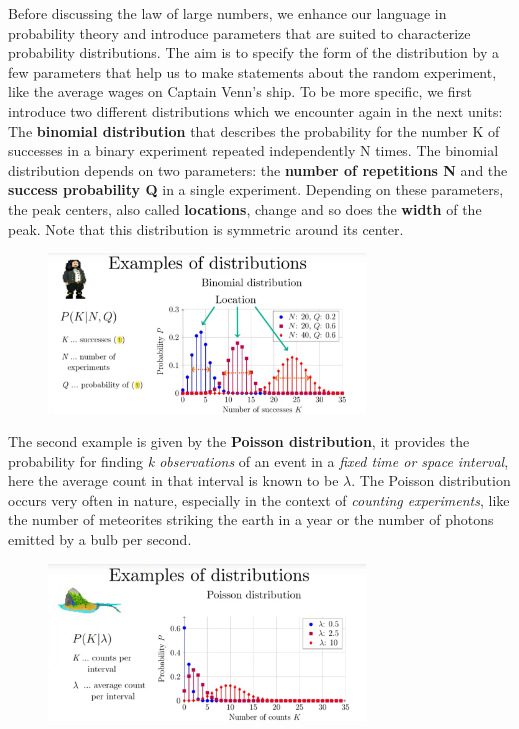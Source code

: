 \documentclass[12pt, a4paper]{scrartcl}
\begin{document}
Before discussing the law of large numbers, we enhance our language in probability theory and introduce parameters that are suited to characterize probability distributions.
The aim is to specify the form of the distribution by a few parameters that help us to make statements about the random experiment, like the average wages on Captain Venn's ship.
To be more specific, we first introduce two different distributions which we encounter again in the next units:
The \textbf{binomial distribution} that describes the probability for the number K of successes in a binary experiment repeated independently N times. The binomial distribution depends on two parameters: the \textbf{number of repetitions N} and the \textbf{success probability Q} in a single experiment.
Depending on these parameters, the peak centers, also called \textbf{locations}, change and so does the \textbf{width} of the peak. Note that this distribution is symmetric around its center.
\begin{figure}[H]
	\centering
	\includegraphics[width=0.75\textwidth]{2_4.png}
\end{figure}
The second example is given by the \textbf{Poisson distribution}, it provides the probability for finding \textit{k observations} of an event in a \textit{fixed time or space interval}, here the average count in that interval is known to be $\lambda$. 
The Poisson distribution occurs very often in nature, especially in the context of \textit{counting experiments}, like the number of meteorites striking the earth in a year or the number of photons emitted by a bulb per second.\\
\begin{figure}[H]
	\centering
	\includegraphics[width=0.75\textwidth]{2_5.png}
\end{figure}
\end{document}
